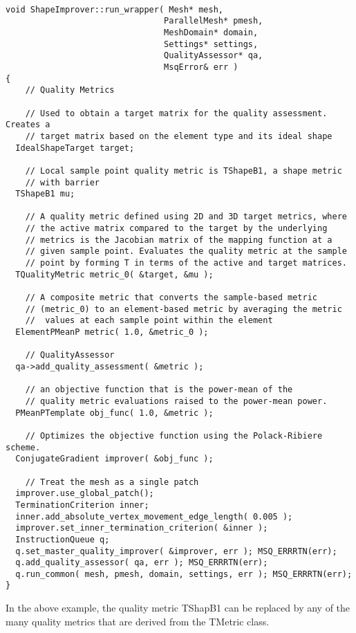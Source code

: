 \begin{lstlisting}[frame=single]

void ShapeImprover::run_wrapper( Mesh* mesh,
                                ParallelMesh* pmesh,
                                MeshDomain* domain,
                                Settings* settings,
                                QualityAssessor* qa,
                                MsqError& err )
{
    // Quality Metrics

    // Used to obtain a target matrix for the quality assessment. Creates a
    // target matrix based on the element type and its ideal shape
  IdealShapeTarget target;

    // Local sample point quality metric is TShapeB1, a shape metric 
    // with barrier
  TShapeB1 mu;

    // A quality metric defined using 2D and 3D target metrics, where 
    // the active matrix compared to the target by the underlying 
    // metrics is the Jacobian matrix of the mapping function at a 
    // given sample point. Evaluates the quality metric at the sample
    // point by forming T in terms of the active and target matrices.
  TQualityMetric metric_0( &target, &mu );

    // A composite metric that converts the sample-based metric 
    // (metric_0) to an element-based metric by averaging the metric
    //  values at each sample point within the element
  ElementPMeanP metric( 1.0, &metric_0 );

    // QualityAssessor
  qa->add_quality_assessment( &metric );
    
    // an objective function that is the power-mean of the 
    // quality metric evaluations raised to the power-mean power.
  PMeanPTemplate obj_func( 1.0, &metric );

    // Optimizes the objective function using the Polack-Ribiere scheme.
  ConjugateGradient improver( &obj_func );

    // Treat the mesh as a single patch
  improver.use_global_patch();
  TerminationCriterion inner;
  inner.add_absolute_vertex_movement_edge_length( 0.005 );
  improver.set_inner_termination_criterion( &inner );
  InstructionQueue q;
  q.set_master_quality_improver( &improver, err ); MSQ_ERRRTN(err);
  q.add_quality_assessor( qa, err ); MSQ_ERRRTN(err);
  q.run_common( mesh, pmesh, domain, settings, err ); MSQ_ERRRTN(err);
}

\end{lstlisting}

In the above example, the quality metric TShapB1 can be replaced by any of the many quality metrics that are derived from the TMetric class.

